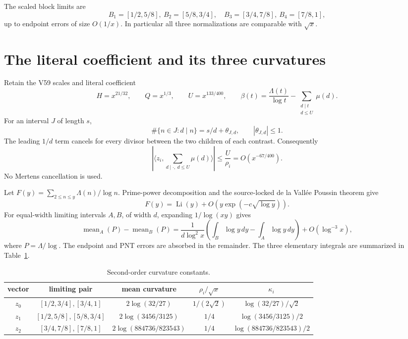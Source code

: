 \documentclass[10pt]{article}
\newcommand{\ip}[2]{\langle #1,#2\rangle}
\newcommand{\Li}{\operatorname{Li}}
\begin{document}
The scaled block limits are
\[
 B_1=[1/2,5/8],\ B_2=[5/8,3/4],\quad
 B_3=[3/4,7/8],\ B_4=[7/8,1],
\]
up to endpoint errors of size \(O(1/x)\).  In particular all three
normalizations are comparable with \(\sqrt{x}\).

\section{The literal coefficient and its three curvatures}

Retain the V59 scales and literal coefficient
\begin{equation}
 H=x^{21/32},\qquad Q=x^{1/3},\qquad U=x^{133/400},
 \qquad \beta(t)=\frac{\Lambda(t)}{\log t}
 -\sum_{\substack{d\mid t\\d\leq U}}\mu(d).             \label{eq:beta}
\end{equation}
For an interval \(J\) of length \(s\),
\[
 \#\{n\in J:d\mid n\}=s/d+\theta_{J,d},\qquad
 |\theta_{J,d}|\leq 1.
\]
The leading \(1/d\) term cancels for every divisor between the two children
of each contrast.  Consequently
\begin{equation}
 \left|\ip{z_i}{\sum_{d\mid\cdot,\ d\leq U}\mu(d)}\right|
 \leq \frac{U}{\rho_i}=O(x^{-67/400}).                 \label{eq:divisor}
\end{equation}
No Mertens cancellation is used.

Let \(F(y)=\sum_{2\leq n\leq y}\Lambda(n)/\log n\).  Prime-power
decomposition and the source-locked de la Vallée Poussin theorem
\cite{davenport,montgomery-vaughan,ik,tpc233} give
\begin{equation}
 F(y)=\Li(y)+O\left(y\exp(-c\sqrt{\log y})\right).     \label{eq:pnt}
\end{equation}
For equal-width limiting intervals \(A,B\), of width \(d\), expanding
\(1/\log(xy)\) gives
\begin{equation}
 \operatorname{mean}_A(P)-\operatorname{mean}_B(P)
 =\frac{1}{d\log^2x}
   \left(\int_B\log y\,dy-\int_A\log y\,dy\right)
   +O(\log^{-3}x),                                    \label{eq:curvature}
\end{equation}
where \(P=\Lambda/\log\).  The endpoint and PNT errors are absorbed in the
remainder.  The three elementary integrals are summarized in Table~\ref{tab:curv}.

\begin{table}[ht]
\centering
\caption{Second-order curvature constants.}
\label{tab:curv}
\begin{tabular}{@{}ccccc@{}}
\toprule
vector & limiting pair & mean curvature & $\rho_i/\sqrt{x}$ & $\kappa_i$\\
\midrule
$z_0$ & $[1/2,3/4],[3/4,1]$ & $2\log(32/27)$ & $1/(2\sqrt2)$ & $\log(32/27)/\sqrt2$\\
$z_1$ & $[1/2,5/8],[5/8,3/4]$ & $2\log(3456/3125)$ & $1/4$ & $\log(3456/3125)/2$\\
$z_2$ & $[3/4,7/8],[7/8,1]$ & $2\log(884736/823543)$ & $1/4$ & $\log(884736/823543)/2$\\
\bottomrule
\end{tabular}
\end{table}
\end{document}
